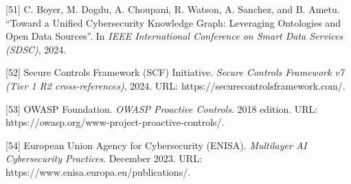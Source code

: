 \documentclass[
]{article}
\begin{document}
{[}51{]} C. Boyer, M. Dogdu, A. Choupani, R. Watson, A. Sanchez, and B.
Ametu. ``Toward a Unified Cybersecurity Knowledge Graph: Leveraging
Ontologies and Open Data Sources''. In \emph{IEEE International
Conference on Smart Data Services (SDSC)}, 2024.

{[}52{]} Secure Controls Framework (SCF) Initiative. \emph{Secure
Controls Framework v7 (Tier 1 R2 cross-references)}, 2024. URL:
https://securecontrolsframework.com/.

{[}53{]} OWASP Foundation. \emph{OWASP Proactive Controls}. 2018
edition. URL: https://owasp.org/www-project-proactive-controls/.

{[}54{]} European Union Agency for Cybersecurity (ENISA).
\emph{Multilayer AI Cybersecurity Practices}. December 2023. URL:
https://www.enisa.europa.eu/publications/.
\end{document}
